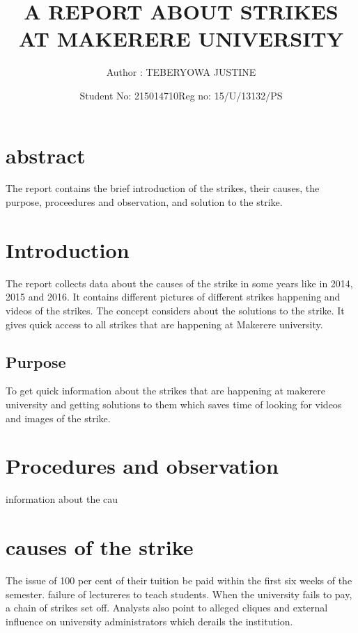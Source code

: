 \documentclass{article}
\begin{document}
		\title{A REPORT ABOUT STRIKES AT MAKERERE UNIVERSITY}
		\author{Author :  TEBERYOWA  JUSTINE }
		\date{Student No: 215014710}
                      \date{Reg no: 15/U/13132/PS}
		\maketitle
	

	\tableofcontents

\section{abstract}
The report contains the brief introduction of the strikes, their causes, the purpose, proceedures and observation, and solution to the strike.


\section{Introduction}
The report collects data about the causes of the strike in some years like in 2014, 2015 and 2016. It contains different pictures of different strikes happening and videos of the strikes.
The concept considers about the solutions to the strike.
It gives quick access to all strikes that are happening at Makerere university.


\subsection{Purpose}
    
To get quick information about the strikes that are happening at makerere university and getting solutions to them which saves time of looking for videos and images of the strike.

\section{Procedures and observation}
information about the cau

\section{causes of the strike}
The issue of 100 per cent of their tuition be paid within the first six weeks of the semester.
failure of lectureres to teach students.
 When the university fails to pay, a chain of strikes set off.
Analysts also point to alleged cliques and external influence on university administrators which derails the institution.
\end{document}
